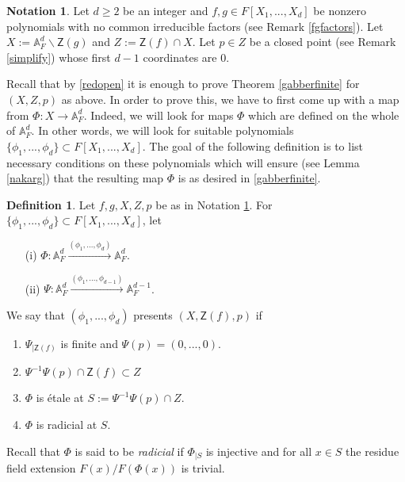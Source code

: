 \documentclass[10pt]{amsart}
\theoremstyle{plain}
\theoremstyle{definition}
\newtheorem{notation}[thm]{Notation}
\newtheorem{definition}[thm]{Definition}
\newcommand{\intersection}{\cap}
\newcommand{\A}{{\mathbb A}}
\let\syn\mathsf
\begin{document}
\begin{notation} \label{not:openad}
Let $d\geq 2$ be an integer and $f,g\in F[X_1,...,X_d]$ be nonzero polynomials with no common irreducible factors (see Remark \ref{fgfactors}). Let $X:=\A^d_F\backslash \syn{Z}(g)$ and $Z:=\syn{Z}(f)\intersection X$. Let $p\in Z$ be a closed point (see Remark \ref{simplify}) whose first $d-1$ coordinates are $0$.  
\end{notation}

Recall that by \ref{redopen} it is enough to prove Theorem \ref{gabberfinite} for $(X,Z,p)$ as above. In order to prove this, we have to first come up with a map from $\Phi:X \to \A^d_F$. Indeed, we will look for maps $\Phi$ which are defined on the whole of $\A^d_F$. In other words, we will look for suitable polynomials $\{\phi_1,...,\phi_d\} \subset F[X_1,...,X_d]$. The goal of the following definition is to list necessary conditions on these polynomials which will ensure (see Lemma \ref{nakarg}) that the resulting map $\Phi$ is as desired in \eqref{gabberfinite}.

\begin{definition} \label{defpresents} Let $f,g, X, Z, p$ be as in Notation \ref{not:openad}. 
For $\{\phi_1,...,\phi_d\}\subset F[X_1,...,X_d]$, let
\begin{enumerate}
\item[(i)] $\Phi:\A^d_F\xrightarrow{(\phi_1,...,\phi_d)} \A^d_F$.
\item[(ii)] $\Psi:\A^d_F\xrightarrow{(\phi_1,...,\phi_{d-1})} \A^{d-1}_F$.
\end{enumerate}
We say that $(\phi_1,...,\phi_d)$ presents $(X,\syn{Z}(f),p)$ if 
\begin{enumerate}
\item $\Psi_{|\syn{Z}(f)}$ is finite and $\Psi(p)= (0,...,0)$. 
\item $\Psi^{-1}\Psi(p)\intersection \syn{Z}(f) \subset Z$ 
\item $\Phi$ is \'{e}tale at $S:=\Psi^{-1}\Psi(p)\intersection Z$. 
\item $\Phi$ is radicial at $S$. 
\end{enumerate}
\end{definition}

Recall that $\Phi$ is said to be {\em radicial} \cite[Tag 01S2]{stacks}  if $\Phi_{|S}$  is injective  and for all $x \in S$ the residue field extension $F(x)/F(\Phi( x))$ is trivial.\\
\end{document}
